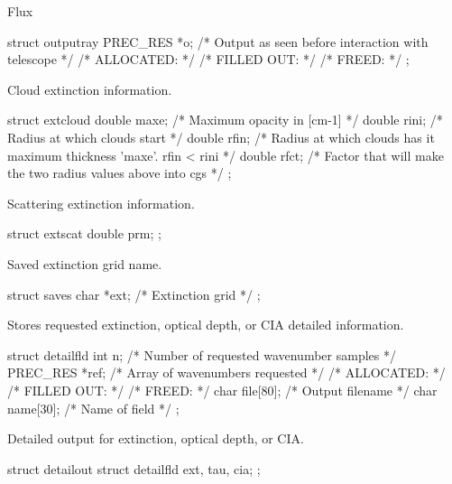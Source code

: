 \documentclass[letterpaper,12pt]{article}
\begin{document}
\noindent
Flux
\begin{plain}
struct outputray{
  PREC_RES *o;     /* Output as seen before interaction with telescope      */
    /* ALLOCATED:							    */
    /* FILLED OUT:							    */
    /* FREED: 								    */ 
};
\end{plain}

\noindent
Cloud extinction information.
\begin{plain}
struct extcloud{
  double maxe;     /* Maximum opacity in [cm-1]                          */
  double rini;     /* Radius at which clouds start                       */
  double rfin;     /* Radius at which clouds has it maximum thickness
                      'maxe'. rfin < rini                                */
  double rfct;     /* Factor that will make the two radius values above
                      into cgs                                           */
};
\end{plain}

\noindent
Scattering extinction information.
\begin{plain}
struct extscat{
  double prm;
};
\end{plain}

\noindent
Saved extinction grid name.
\begin{plain}
struct saves{
  char *ext;   /* Extinction grid                                           */
};
\end{plain}

\noindent
Stores requested extinction, optical depth, or CIA detailed information.
\begin{plain}
struct detailfld{
  int n;         /* Number of requested wavenumber samples */
  PREC_RES *ref; /* Array of wavenumbers requested         */
    /* ALLOCATED:							    */
    /* FILLED OUT:							    */
    /* FREED: 								    */ 
  char file[80]; /* Output filename                        */
  char name[30]; /* Name of field                          */
};
\end{plain}

\noindent
Detailed output for extinction, optical depth, or CIA.
\begin{plain}
struct detailout{
  struct detailfld ext, tau, cia;
};
\end{plain}
\end{document}
